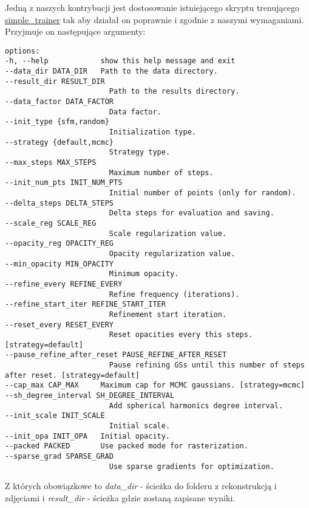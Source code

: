 Jedną z naszych kontrybucji jest dostosowanie istniejącego skryptu trenującego \href{https://github.com/nerfstudio-project/gsplat/blob/main/examples/simple_trainer.py}{simple\_trainer} tak aby działał on poprawnie i zgodnie z naszymi wymaganiami. Przyjmuje on następujące argumenty:

\lstset{style=basicstyle}
\begin{lstlisting}[language=SHELXL] 
options:
-h, --help            show this help message and exit
--data_dir DATA_DIR   Path to the data directory.
--result_dir RESULT_DIR
                        Path to the results directory.
--data_factor DATA_FACTOR
                        Data factor.
--init_type {sfm,random}
                        Initialization type.
--strategy {default,mcmc}
                        Strategy type.
--max_steps MAX_STEPS
                        Maximum number of steps.
--init_num_pts INIT_NUM_PTS
                        Initial number of points (only for random).
--delta_steps DELTA_STEPS
                        Delta steps for evaluation and saving.
--scale_reg SCALE_REG
                        Scale regularization value.
--opacity_reg OPACITY_REG
                        Opacity regularization value.
--min_opacity MIN_OPACITY
                        Minimum opacity.
--refine_every REFINE_EVERY
                        Refine frequency (iterations).
--refine_start_iter REFINE_START_ITER
                        Refinement start iteration.
--reset_every RESET_EVERY
                        Reset opacities every this steps. [strategy=default]
--pause_refine_after_reset PAUSE_REFINE_AFTER_RESET
                        Pause refining GSs until this number of steps after reset. [strategy=default]
--cap_max CAP_MAX     Maximum cap for MCMC gaussians. [strategy=mcmc]
--sh_degree_interval SH_DEGREE_INTERVAL
                        Add spherical harmonics degree interval.
--init_scale INIT_SCALE
                        Initial scale.
--init_opa INIT_OPA   Initial opacity.
--packed PACKED       Use packed mode for rasterization.
--sparse_grad SPARSE_GRAD
                        Use sparse gradients for optimization.

\end{lstlisting}

\lstset{style=pythonstyle}

Z których obowiązkowe to \textit{data\_dir} - ścieżka do folderu z rekonstrukcją i zdjęciami i \textit{result\_dir} - ścieżka gdzie zostaną zapisane wyniki. 

